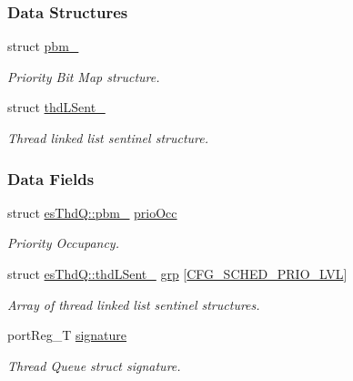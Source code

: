 \subsubsection*{Data Structures}
\begin{DoxyCompactItemize}
\item 
struct \hyperlink{structesThdQ_1_1pbm__}{pbm\-\_\-}
\begin{DoxyCompactList}\small\item\em Priority Bit Map structure. \end{DoxyCompactList}\item 
struct \hyperlink{structesThdQ_1_1thdLSent__}{thd\-L\-Sent\-\_\-}
\begin{DoxyCompactList}\small\item\em Thread linked list sentinel structure. \end{DoxyCompactList}\end{DoxyCompactItemize}
\subsubsection*{Data Fields}
\begin{DoxyCompactItemize}
\item 
struct \hyperlink{structesThdQ_1_1pbm__}{es\-Thd\-Q\-::pbm\-\_\-} \hyperlink{structesThdQ_a3ded234a55356bb708c55339d8438b0a}{prio\-Occ}
\begin{DoxyCompactList}\small\item\em Priority Occupancy. \end{DoxyCompactList}\item 
struct \hyperlink{structesThdQ_1_1thdLSent__}{es\-Thd\-Q\-::thd\-L\-Sent\-\_\-} \hyperlink{structesThdQ_ac658d22a97cdceefa9d72c3e9e1a675e}{grp} \mbox{[}\hyperlink{group__template__kern__cfg_ga56bd89fe76f7fe22f3d8805bc3c68892}{C\-F\-G\-\_\-\-S\-C\-H\-E\-D\-\_\-\-P\-R\-I\-O\-\_\-\-L\-V\-L}\mbox{]}
\begin{DoxyCompactList}\small\item\em Array of thread linked list sentinel structures. \end{DoxyCompactList}\item 
port\-Reg\-\_\-\-T \hyperlink{structesThdQ_a2756407c94319267cbf5d30814182b4d}{signature}
\begin{DoxyCompactList}\small\item\em Thread Queue struct signature. \end{DoxyCompactList}\end{DoxyCompactItemize}


